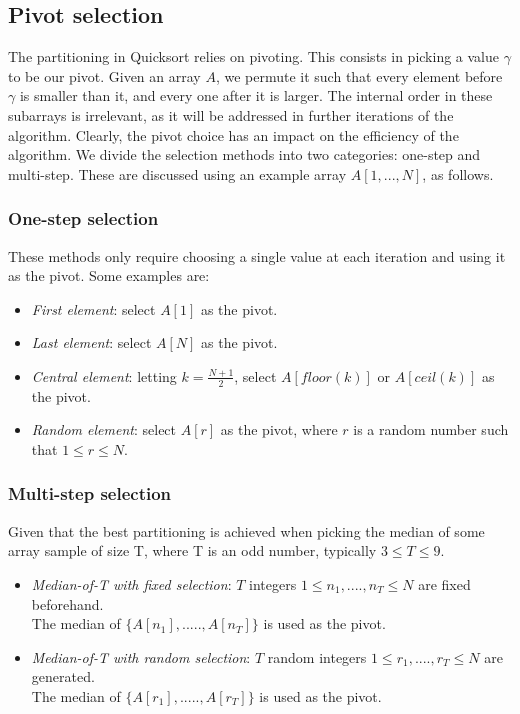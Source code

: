 \documentclass[]{finalproject}
\begin{document}
\subsection{Pivot selection}
The partitioning in Quicksort relies on pivoting. This consists in picking a value $\gamma$ to be our pivot.
Given an array $A$, we permute it such that every element before $\gamma$ is smaller than it, and every one after it is larger.
The internal order in these subarrays is irrelevant, as it will be addressed in further iterations of the algorithm.
Clearly, the pivot choice has an impact on the efficiency of the algorithm. We divide the selection methods into two categories: one-step and multi-step.
These are discussed using an example array $A[1, ..., N]$, as follows.

\subsubsection{One-step selection}
These methods only require choosing a single value at each iteration and using it as the pivot. Some examples are:

\begin{itemize}
\item \textit{First element}: select $A[1]$ as the pivot.
\item \textit{Last element}: select $A[N]$ as the pivot.
\item \textit{Central element}: letting $k=\frac{N+1}{2}$, select $A[floor(k)]$ or $A[ceil(k)]$ as the pivot.
\item \textit{Random element}: select $A[r]$ as the pivot, where $r$ is a random number such that $1 \leq r \leq N$.
\end{itemize}

\subsubsection{Multi-step selection}
Given that the best partitioning is achieved when picking the median of some array sample of size T, where T is an odd number, typically $3 \leq T \leq 9$.

\begin{itemize}
\item \textit{Median-of-T with fixed selection}: $T$ integers $1 \leq n_{1},....,n_{T} \leq N$ are fixed beforehand. \\
The median of $\{A[n_{1}],.....,A[n_{T}]\}$ is used as the pivot.
\item \textit{Median-of-T with random selection}: $T$ random integers $1 \leq r_{1},....,r_{T} \leq N$ are generated. \\
The median of $\{A[r_{1}],.....,A[r_{T}]\}$ is used as the pivot.
\end{itemize}
\end{document}
